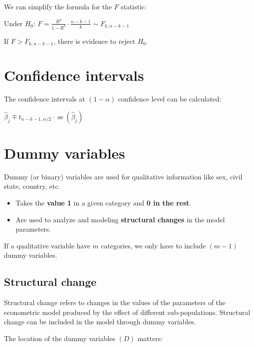 \documentclass[10pt, a4paper, landscape]{article}
\DeclareMathOperator{\se}{se}
\begin{document}
\begin{multicols}{3}
We can simplify the formula for the \( F \) statistic:

\begin{center}
	Under \( H_{0} \): \quad \( F = \frac{R^{2}}{1 - R^{2}} \cdot \frac{n - k - 1}{k} \sim F_{k, n - k - 1} \)
\end{center}

If \( F > F_{k, n - k - 1} \), there is evidence to reject \( H_{0} \).

\section*{Confidence intervals}

The confidence intervals at \( (1 - \alpha) \) confidence level can be calculated:

\begin{center}
	\( \hat{\beta}_{j} \mp t_{n - k - 1, \alpha / 2} \cdot \se(\hat{\beta}_{j}) \)
\end{center}

\columnbreak

\section*{Dummy variables}

Dummy (or binary) variables are used for qualitative information like sex, civil state, country, etc.

\begin{itemize}[leftmargin=*]
	\item Takes the \textbf{value 1} in a given category and \textbf{0 in the rest}.
	\item Are used to analyze and modeling \textbf{structural changes} in the model parameters.
\end{itemize}

If a qualitative variable have \( m \) categories, we only have to include \( (m - 1) \) dummy variables.

\subsection*{Structural change}

Structural change refers to changes in the values of the parameters of the econometric model produced by the effect of different sub-populations. Structural change can be included in the model through dummy variables.

The location of the dummy variables \( (D) \) matters:


\end{multicols}
\end{document}
